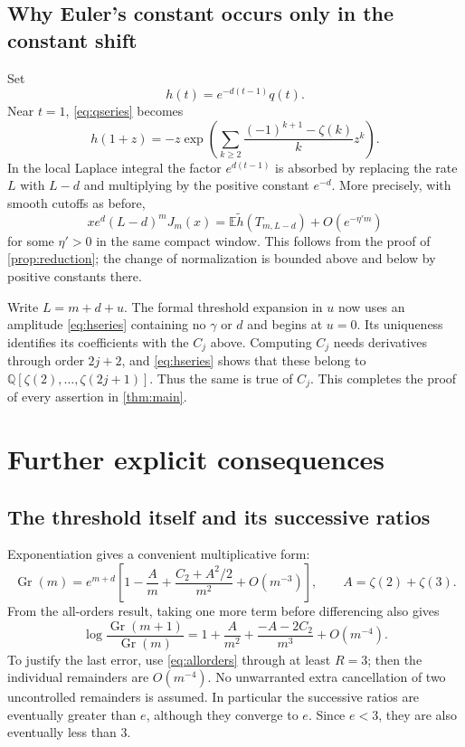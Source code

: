 \documentclass[11pt]{article}
\numberwithin{equation}{section}
\theoremstyle{definition}
\newcommand{\Gr}{\operatorname{Gr}}
\newcommand{\E}{\mathbb E}
\newcommand{\Q}{\mathbb Q}
\begin{document}
\subsection{Why Euler's constant occurs only in the constant shift}
Set
\[
 h(t)=e^{-d(t-1)}q(t).
\]
Near $t=1$, \eqref{eq:qseries} becomes
\begin{equation}\label{eq:hseries}
 h(1+z)=-z\exp\left(
        \sum_{k\ge2}\frac{(-1)^{k+1}-\zeta(k)}{k}z^k\right).
\end{equation}
In the local Laplace integral the factor $e^{d(t-1)}$ is absorbed by
replacing the rate $L$ with $L-d$ and multiplying by the positive constant
$e^{-d}$. More precisely, with smooth cutoffs as before,
\[
 x e^d(L-d)^mJ_m(x)
   =\E\widetilde h(T_{m,L-d})+O(e^{-\eta' m})
\]
for some $\eta'>0$ in the same compact window. This follows from the
proof of \cref{prop:reduction}; the change of normalization is bounded
above and below by positive constants there.

Write $L=m+d+u$. The formal threshold expansion in $u$ now uses an
amplitude \eqref{eq:hseries} containing no $\gamma$ or $d$ and begins at
$u=0$. Its uniqueness identifies its coefficients with the $C_j$ above.
Computing $C_j$ needs derivatives through order $2j+2$, and
\eqref{eq:hseries} shows that these belong to
$\Q[\zeta(2),\ldots,\zeta(2j+1)]$. Thus the same is true of $C_j$.
This completes the proof of every assertion in \cref{thm:main}.

\section{Further explicit consequences}\label{sec:consequences}

\subsection{The threshold itself and its successive ratios}
Exponentiation gives a convenient multiplicative form:
\begin{equation}\label{eq:multiplicative}
 \Gr(m)=e^{m+d}\left[
   1-\frac{A}{m}+\frac{C_2+A^2/2}{m^2}+O(m^{-3})\right],
 \qquad A=\zeta(2)+\zeta(3).
\end{equation}
From the all-orders result, taking one more term before differencing
also gives
\begin{equation}\label{eq:ratioexpansion}
 \log\frac{\Gr(m+1)}{\Gr(m)}
 =1+\frac{A}{m^2}+\frac{-A-2C_2}{m^3}+O(m^{-4}).
\end{equation}
To justify the last error, use \eqref{eq:allorders} through at least
$R=3$; then the individual remainders are $O(m^{-4})$. No unwarranted
extra cancellation of two uncontrolled remainders is assumed.
In particular the successive ratios are eventually greater than $e$,
although they converge to $e$. Since $e<3$, they are also eventually
less than $3$.
\end{document}
